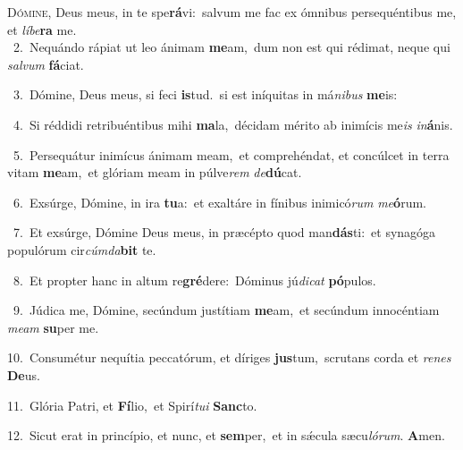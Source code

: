 \lettrine{\initial\textcolor{\initialcolor}{D}}{ómine,} Deus meus, in te spe\-\textbf{rá}\-vi:~\star salvum me fac ex ómnibus persequéntibus me, et \textit{lí}\-\textit{be}\textbf{ra} me.\\
{\numbfont\textcolor{\numbcolor}{~2.}}~Nequándo rápiat ut leo ánimam \textbf{me}\-am,~\star dum non est qui rédimat, neque qui \textit{sal}\-\textit{vum} \textbf{fá}\-ciat.\par
{\numbfont\textcolor{\numbcolor}{~3.}}~Dómine, Deus meus, si feci \textbf{is}\-tud.~\star si est iníquitas in má\-\textit{ni}\-\textit{bus} \textbf{me}\-is:\par
{\numbfont\textcolor{\numbcolor}{~4.}}~Si réddidi retribuéntibus mihi \textbf{ma}\-la,~\star décidam mérito ab inimícis me\textit{is} \textit{in}\-\textbf{á}nis.\par
{\numbfont\textcolor{\numbcolor}{~5.}}~Persequátur inimícus ánimam meam,~\dagger et comprehéndat, et concúlcet in terra vitam \textbf{me}\-am,~\star et glóriam meam in púlve\textit{rem} \textit{de}\-\textbf{dú}cat.\par
{\numbfont\textcolor{\numbcolor}{~6.}}~Exsúrge, Dómine, in ira \textbf{tu}\-a:~\star et exaltáre in fínibus inimicó\textit{rum} \textit{me}\-\textbf{ó}rum.\par
{\numbfont\textcolor{\numbcolor}{~7.}}~Et exsúrge, Dómine Deus meus, in præcépto quod man\-\textbf{dás}\-ti:~\star et synagóga populórum cir\-\textit{cúm}\-\textit{da}\textbf{bit} te.\par
{\numbfont\textcolor{\numbcolor}{~8.}}~Et propter hanc in altum re\-\textbf{gré}\-dere:~\star Dóminus jú\-\textit{di}\-\textit{cat} \textbf{pó}\-pulos.\par
{\numbfont\textcolor{\numbcolor}{~9.}}~Júdica me, Dómine, secúndum justítiam \textbf{me}\-am,~\star et secúndum innocéntiam \textit{me}\-\textit{am} \textbf{su}\-per me.\par
{\numbfont\textcolor{\numbcolor}{10.}}~Consumétur nequítia peccatórum, et díriges \textbf{jus}\-tum,~\star scrutans corda et \textit{re}\-\textit{nes} \textbf{De}\-us.\par
{\numbfont\textcolor{\numbcolor}{11.}}~Glória Patri, et \textbf{Fí}\-lio,~\star et Spirí\-\textit{tu}\-\textit{i} \textbf{Sanc}\-to.\par
{\numbfont\textcolor{\numbcolor}{12.}}~Sicut erat in princípio, et nunc, et \textbf{sem}\-per,~\star et in sǽcula sæcu\-\textit{ló}\-\textit{rum}. \textbf{A}\-men.\par
